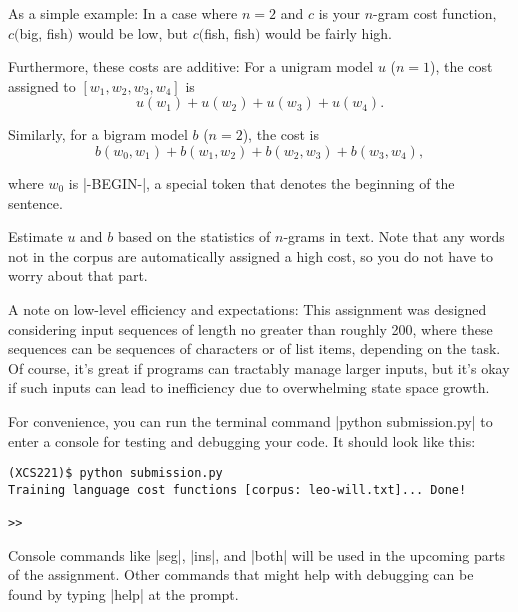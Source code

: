 As a simple example: In a case where $n=2$ and $c$ is your $n$-gram cost
function, $c(${\sf big}, {\sf fish}$)$ would be low, but $c(${\sf fish},
{\sf fish}$)$ would be fairly high.

Furthermore, these costs are additive: For a unigram model $u$ ($n = 1$), the
cost assigned to $[w_1, w_2, w_3, w_4]$ is
\[
u(w_1) + u(w_2) + u(w_3) + u(w_4).
\]

Similarly, for a bigram model $b$ ($n = 2$), the cost is
\[
b(w_0, w_1) +
b(w_1, w_2) +
b(w_2, w_3) +
b(w_3, w_4),
\]

where $w_0$ is |-BEGIN-|, a special token that denotes the beginning of the
sentence.

Estimate $u$ and $b$ based on the statistics of $n$-grams in text. Note
that any words not in the corpus are automatically assigned a high cost, so you
do not have to worry about that part.

A note on low-level efficiency and expectations: This assignment was designed
considering input sequences of length no greater than roughly 200, where these
sequences can be sequences of characters or of list items, depending on the
task.  Of course, it's great if programs can tractably manage larger inputs, but
it's okay if such inputs can lead to inefficiency due to overwhelming state
space growth.

For convenience, you can run the terminal command |python submission.py| to
enter a console for testing and debugging your code.  It should look like this:
\begin{lstlisting}
(XCS221)$ python submission.py
Training language cost functions [corpus: leo-will.txt]... Done!

>> 
\end{lstlisting}

Console commands like |seg|, |ins|, and |both| will be used in the upcoming
parts of the assignment.  Other commands that might help with debugging can be
found by typing |help| at the prompt.
